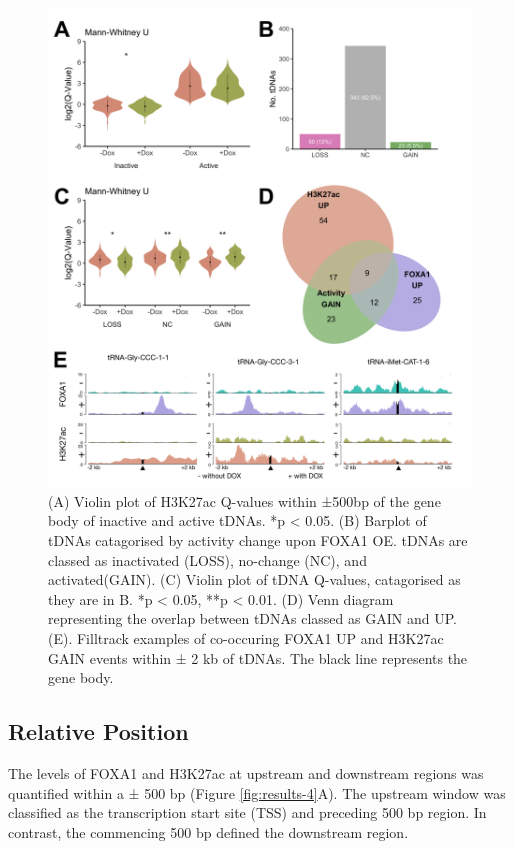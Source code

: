 \documentclass[
  12pt,
]{article}
\begin{document}
\begin{figure}[H]
\includegraphics[width=1\linewidth]{../images/results-03} \caption{(A) Violin plot of H3K27ac Q-values within ±500bp of the gene body of inactive and active tDNAs. *p < 0.05. (B) Barplot of tDNAs catagorised by activity change upon FOXA1 OE. tDNAs are classed as inactivated (LOSS), no-change (NC), and activated(GAIN). (C) Violin plot of tDNA Q-values, catagorised as they are in B. *p < 0.05, **p < 0.01. (D) Venn diagram representing the overlap between tDNAs classed as GAIN and UP. (E). Filltrack examples of co-occuring FOXA1 UP and H3K27ac GAIN events within ± 2 kb of tDNAs. The black line represents the gene body.}\label{fig:results-3}
\end{figure}

\hypertarget{relative-position}{%
\subsection{Relative Position}\label{relative-position}}

The levels of FOXA1 and H3K27ac at upstream and downstream regions was quantified within a ± 500 bp (Figure \ref{fig:results-4}A).
The upstream window was classified as the transcription start site (TSS) and preceding 500 bp region.
In contrast, the commencing 500 bp defined the downstream region.
\end{document}
